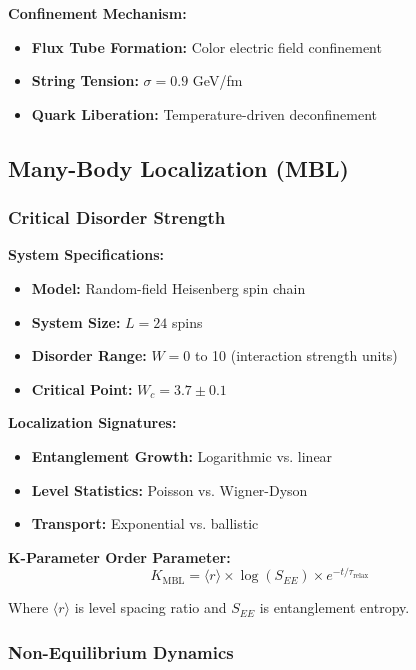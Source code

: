 \documentclass[11pt,a4paper,twoside]{article}
\begin{document}
\textbf{Confinement Mechanism:}
\begin{itemize}[leftmargin=*]
    \item \textbf{Flux Tube Formation:} Color electric field confinement
    \item \textbf{String Tension:} $\sigma = 0.9$ GeV/fm
    \item \textbf{Quark Liberation:} Temperature-driven deconfinement
\end{itemize}

\subsection{Many-Body Localization (MBL)}

\subsubsection{Critical Disorder Strength}

\textbf{System Specifications:}
\begin{itemize}[leftmargin=*]
    \item \textbf{Model:} Random-field Heisenberg spin chain
    \item \textbf{System Size:} $L = 24$ spins
    \item \textbf{Disorder Range:} $W = 0$ to 10 (interaction strength units)
    \item \textbf{Critical Point:} $W_c = 3.7 \pm 0.1$
\end{itemize}

\textbf{Localization Signatures:}
\begin{itemize}[leftmargin=*]
    \item \textbf{Entanglement Growth:} Logarithmic vs. linear
    \item \textbf{Level Statistics:} Poisson vs. Wigner-Dyson
    \item \textbf{Transport:} Exponential vs. ballistic
\end{itemize}

\textbf{K-Parameter Order Parameter:}
\begin{equation}
K_{\text{MBL}} = \langle r \rangle \times \log(S_{EE}) \times e^{-t/\tau_{\text{relax}}}
\end{equation}

Where $\langle r \rangle$ is level spacing ratio and $S_{EE}$ is entanglement entropy.

\subsubsection{Non-Equilibrium Dynamics}
\end{document}
